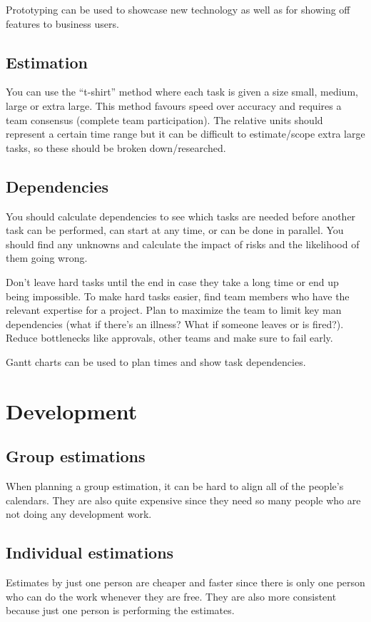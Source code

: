 \medskip
\noindent
Prototyping can be used to showcase new technology as well as for showing off features to business users.

\subsection{Estimation}\label{sub:estimation}

You can use the ``t-shirt'' method where each task is given a size small, medium, large or extra large.
This method favours speed over accuracy and requires a team consensus (complete team participation).
The relative units should represent a certain time range but it can be difficult to estimate/scope extra large tasks, so these should be broken down/researched.

\subsection{Dependencies}\label{sub:dependencies}

You should calculate dependencies to see which tasks are needed before another task can be performed, can start at any time, or can be done in parallel.
You should find any unknowns and calculate the impact of risks and the likelihood of them going wrong.

Don't leave hard tasks until the end in case they take a long time or end up being impossible.
To make hard tasks easier, find team members who have the relevant expertise for a project.
Plan to maximize the team to limit key man dependencies (what if there's an illness? What if someone leaves or is fired?).
Reduce bottlenecks like approvals, other teams and make sure to fail early.

Gantt charts can be used to plan times and show task dependencies.

\section{Development}\label{sec:development}

\subsection{Group estimations}\label{sub:group_estimations}

When planning a group estimation, it can be hard to align all of the people's calendars.
They are also quite expensive since they need so many people who are not doing any development work.

\subsection{Individual estimations}\label{sub:individual_estimations}

Estimates by just one person are cheaper and faster since there is only one person who can do the work whenever they are free.
They are also more consistent because just one person is performing the estimates.
